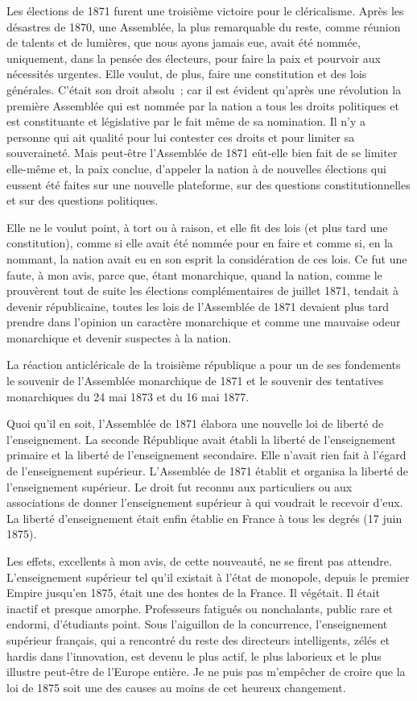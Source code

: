\documentclass[french,twoside]{book} %
\begin{document}
\noindent Les élections de 1871 furent une troisième victoire pour le cléricalisme. Après les désastres de 1870, une Assemblée, la plus remarquable du reste, comme réunion de talents et de lumières, que nous ayons jamais eue, avait été nommée, uniquement, dans la pensée des électeurs, pour faire la paix et pourvoir aux nécessités urgentes. Elle voulut, de plus, faire une constitution et des lois générales. C’était son droit absolu ; car il est évident qu’après une révolution la première Assemblée qui est nommée par la nation a tous les droits politiques et est constituante et législative par le fait même de sa nomination. Il n’y a personne qui ait qualité pour lui contester ces droits et pour limiter sa souveraineté. Mais peut-être l’Assemblée de 1871 eût-elle bien fait de se limiter elle-même et, la paix conclue, d’appeler la nation à de nouvelles élections  qui eussent été faites sur une nouvelle plateforme, sur des questions constitutionnelles et sur des questions politiques.\par
Elle ne le voulut point, à tort ou à raison, et elle fit des lois (et plus tard une constitution), comme si elle avait été nommée pour en faire et comme si, en la nommant, la nation avait eu en son esprit la considération de ces lois. Ce fut une faute, à mon avis, parce que, étant monarchique, quand la nation, comme le prouvèrent tout de suite les élections complémentaires de juillet 1871, tendait à devenir républicaine, toutes les lois de l’Assemblée de 1871 devaient plus tard prendre dans l’opinion un caractère monarchique et comme une mauvaise odeur monarchique et devenir suspectes à la nation.\par
La réaction anticléricale de la troisième république a pour un de ses fondements le souvenir de l’Assemblée monarchique de 1871 et le souvenir des tentatives monarchiques du 24 mai 1873 et du 16 mai 1877.\par
Quoi qu’il en soit, l’Assemblée de 1871 élabora une nouvelle loi de liberté de l’enseignement. La seconde République avait établi la liberté de l’enseignement primaire et la liberté de l’enseignement secondaire. Elle n’avait rien fait à l’égard de l’enseignement supérieur. L’Assemblée  de 1871 établit et organisa la liberté de l’enseignement supérieur. Le droit fut reconnu aux particuliers ou aux associations de donner l’enseignement supérieur à qui voudrait le recevoir d’eux. La liberté d’enseignement était enfin établie en France à tous les degrés (17 juin 1875).\par
Les effets, excellents à mon avis, de cette nouveauté, ne se firent pas attendre. L’enseignement supérieur tel qu’il existait à l’état de monopole, depuis le premier Empire jusqu’en 1875, était une des hontes de la France. Il végétait. Il était inactif et presque amorphe. Professeurs fatigués ou nonchalants, public rare et endormi, d’étudiants point. Sous l’aiguillon de la concurrence, l’enseignement supérieur français, qui a rencontré du reste des directeurs intelligents, zélés et hardis dans l’innovation, est devenu le plus actif, le plus laborieux et le plus illustre peut-être de l’Europe entière. Je ne puis pas m’empêcher de croire que la loi de 1875 soit une des causes au moins de cet heureux changement.\par
\end{document}
